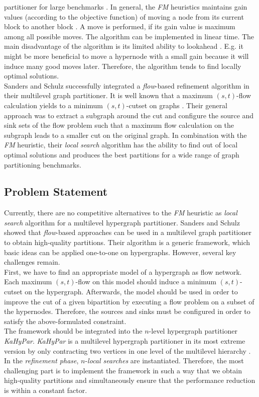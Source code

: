 partitioner for large benchmarks \cite{papa2007hypergraph}. In general, the \emph{FM}
heuristics maintains gain values (according to the objective function) of moving a node
from its current block to another block \cite{fiduccia1988linear}. A move is performed, 
if its gain value is maximum among all possible moves. The algorithm can be implemented 
in linear time. The main disadvantage of the algorithm is its limited ability to lookahead
\cite{zhao2002effective}. E.g. it might be more beneficial to move a hypernode with 
a small gain because it will induce many good moves later. Therefore, the algorithm
tends to find locally optimal solutions. \\ 
Sanders and Schulz \cite{sanders2011engineering} successfully integrated a \emph{flow}-based refinement
algorithm in their multilevel graph partitioner. It is well known that a maximum $(s,t)$-flow
calculation yields to a minimum $(s,t)$-cutset on graphs \cite{ford1956maximal}. Their general
approach was to extract a subgraph around the cut and configure the source and sink sets
of the flow problem such that a maximum flow calculation on the subgraph leads to a 
smaller cut on the original graph. In combination with the \emph{FM} heuristic, their \emph{local
search} algorithm has the ability to find out of local optimal solutions and produces
the best partitions for a wide range of graph partitioning benchmarks.

\subsection{Problem Statement}

Currently, there are no competitive alternatives to the \emph{FM} heuristic as \emph{local search}
algorithm for a multilevel hypergraph partitioner. Sanders and Schulz \cite{sanders2011engineering}
showed that \emph{flow}-based approaches can be used in a multilevel graph partitioner to obtain
high-quality partitions. Their algorithm is a generic framework, which basic ideas can be
applied one-to-one on hypergraphs. However, several key challenges remain.\\
First, we have to find an appropriate model of a hypergraph as flow network. Each maximum
$(s,t)$-flow on this model should induce a minimum $(s,t)$-cutset on the hypergraph.
Afterwards, the model should be used in order to improve the cut of a given bipartition by
executing a flow problem on a subset of the hypernodes. Therefore, the 
sources and sinks must be configured in order to satisfy the above-formulated constraint. \\
The framework should be integrated into the $n$-level hypergraph partitioner 
\emph{KaHyPar}. \emph{KaHyPar} is a multilevel hypergraph partitioner in its most extreme 
version by only contracting two vertices in one level of the multilevel hierarchy
\cite{akhremtsev2017engineering,heuer2017improving,schlag2016k}. In the \emph{refinement 
phase}, $n$-\emph{local searches} are instantiated. Therefore, the most challenging part is
to implement the framework in such a way that we obtain
high-quality partitions and simultaneously ensure that the performance reduction is within
a constant factor.

